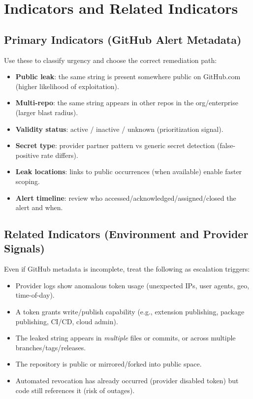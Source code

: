 \documentclass[11pt]{article}
\providecommand{\term}[1]{\textbf{#1}}
\begin{document}
\section{Indicators and Related Indicators}
\subsection{Primary Indicators (GitHub Alert Metadata)}
Use these to classify urgency and choose the correct remediation path:
\begin{itemize}
  \item \term{Public leak}: the same string is present somewhere public on GitHub.com (higher likelihood of exploitation).
  \item \term{Multi-repo}: the same string appears in other repos in the org/enterprise (larger blast radius).
  \item \term{Validity status}: active / inactive / unknown (prioritization signal).
  \item \term{Secret type}: provider partner pattern vs generic secret detection (false-positive rate differs).
  \item \term{Leak locations}: links to public occurrences (when available) enable faster scoping.
  \item \term{Alert timeline}: review who accessed/acknowledged/assigned/closed the alert and when.
\end{itemize}

\subsection{Related Indicators (Environment and Provider Signals)}
Even if GitHub metadata is incomplete, treat the following as escalation triggers:
\begin{itemize}
  \item Provider logs show anomalous token usage (unexpected IPs, user agents, geo, time-of-day).
  \item A token grants write/publish capability (e.g., extension publishing, package publishing, CI/CD, cloud admin).
  \item The leaked string appears in \emph{multiple} files or commits, or across multiple branches/tags/releases.
  \item The repository is public or mirrored/forked into public space.
  \item Automated revocation has already occurred (provider disabled token) but code still references it (risk of outages).
\end{itemize}
\end{document}
